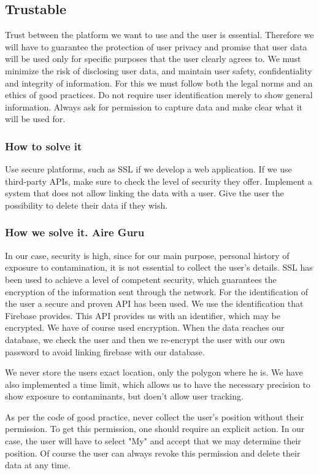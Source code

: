 \subsection{Trustable}
Trust between the platform we want to use and the user is essential.
Therefore we will have to guarantee the protection of user privacy and promise that user data will be used only for specific purposes that the user clearly agrees to.
We must minimize the risk of disclosing user data, and maintain user safety, confidentiality and integrity of information.
For this we must follow both the legal norms and an ethics of good practices.
Do not require user identification merely to show general information.
Always ask for permission to capture data and make clear what it will be used for.

\subsubsection{How to solve it} 
Use secure platforms, such as SSL if we develop a web application.
If we use third-party APIs, make sure to check the level of security they offer.
Implement a system that does not allow linking the data with a user.
Give the user the possibility to delete their data if they wish.


\subsubsection{How we solve it. Aire Guru} 
In our case, security is high, since for our main purpose, personal history
of exposure to contamination, it is not essential to collect the user's details.
SSL has been used to achieve a level of competent security, which guarantees the encryption of
the information sent through the network.
For the identification of the user a secure and proven API has been used. We use the identification
that Firebase provides. This API provides us with an identifier, which may be encrypted.
We have of course used encryption. When the data reaches our database,
we check the user and then we re-encrypt the user with our own password to
avoid linking firebase with our database.

We never store the users exact location, only the polygon where he is.
We have also implemented a time limit, which allows us to have the necessary precision to show exposure to contaminants, but doen't allow user tracking.

As per the code of good practice, never collect the user's position without their permission.
To get this permission, one should require an explicit action. In our case, the user will have to select "My" and accept that we may determine their position. Of course the user can always revoke this permission and
delete their data at any time. \\

